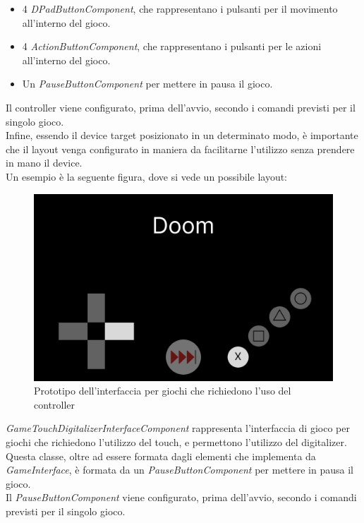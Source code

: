 \begin{itemize}
    \item 4 \emph{DPadButtonComponent}, che rappresentano i pulsanti per il movimento all'interno del gioco.
    \item 4 \emph{ActionButtonComponent}, che rappresentano i pulsanti per le azioni\\ all'interno del gioco.
    \item Un \emph{PauseButtonComponent} per mettere in pausa il gioco.
\end{itemize}
Il controller viene configurato, prima dell'avvio, secondo i comandi previsti per il singolo gioco.\\
Infine, essendo il device target posizionato in un determinato modo, è importante che il layout venga configurato in maniera da facilitarne l'utilizzo senza prendere in mano il device.\\
Un esempio è la seguente figura, dove si vede un possibile layout:
\begin{figure}[h]
    \centering
    \includegraphics[width=340pt]{ProgettazioneTecnica/ControllerMockup.png}
    \caption{Prototipo dell'interfaccia per giochi che richiedono l'uso del controller}
    \label{fig:controller}
\end{figure}
\emph{GameTouchDigitalizerInterfaceComponent} rappresenta l'interfaccia di gioco per giochi che richiedono l'utilizzo del touch, e permettono l'utilizzo del digitalizer.\\
Questa classe, oltre ad essere formata dagli elementi che implementa da \emph{GameInterface}, è formata da un \emph{PauseButtonComponent} per mettere in pausa il gioco.\\
Il \emph{PauseButtonComponent} viene configurato, prima dell'avvio, secondo i comandi previsti per il singolo gioco.\\
